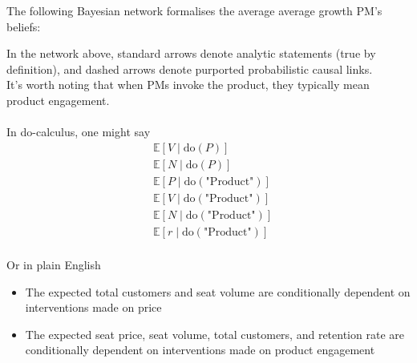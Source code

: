 \documentclass{article}
\begin{document}
The following Bayesian network formalises the average average growth PM's beliefs:

\begin{center}
\end{center}


In the network above, standard arrows denote analytic statements (true by definition), and dashed arrows denote purported probabilistic causal links.  \\

It's worth noting that when PMs invoke the product\texttrademark , they typically mean product engagement. \\ \\ 

In do-calculus, one might say
\[
\begin{aligned}
& \mathbb{E}[V \mid \text{do}(P)] \\
& \mathbb{E}[N \mid \text{do}(P)] \\
& \mathbb{E}[P \mid \text{do}(\text{"Product"})] \\
& \mathbb{E}[V \mid \text{do}(\text{"Product"})] \\
& \mathbb{E}[N \mid \text{do}(\text{"Product"})] \\
& \mathbb{E}[r \mid \text{do}(\text{"Product"})] \\
\end{aligned}
\]

Or in plain English
\begin{itemize}
   \item The expected total customers and seat volume are conditionally dependent on interventions made on price
  \item The expected seat price, seat volume, total customers, and retention rate are conditionally dependent on interventions made on product engagement

\end{itemize}
\end{document}
